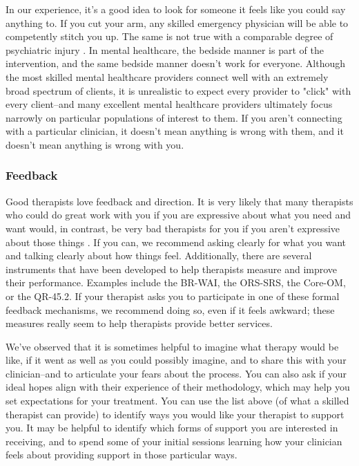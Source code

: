 \documentclass[12pt,letterpaper]{book}
\begin{document}
In our experience, it's a good idea to look for someone it feels like you could say anything to. If you cut your arm, any skilled emergency physician will be able to competently stitch you up. The same is not true with a comparable degree of psychiatric injury \cite{firth2019therapistEffects}. In mental healthcare, the bedside manner is part of the intervention, and the same bedside manner doesn't work for everyone. Although the most skilled mental healthcare providers connect well with an extremely broad spectrum of clients, it is unrealistic to expect every provider to "click" with every client–and many excellent mental healthcare providers ultimately focus narrowly on particular populations of interest to them. If you aren't connecting with a particular clinician, it doesn't mean anything is wrong with them, and it doesn't mean anything is wrong with you.

\subsubsection*{Feedback}
Good therapists love feedback and direction. It is very likely that many therapists who could do great work with you if you are expressive about what you need and want would, in contrast, be very bad therapists for you if you aren't expressive about those things \cite{macdonald2015correcting,delgadillo2022progress,lambert2001effects,oanes2015therapists}. If you can, we recommend asking clearly for what you want and talking clearly about how things feel. Additionally, there are several instruments that have been developed to help therapists measure and improve their performance. Examples include the BR-WAI, the ORS-SRS, the Core-OM, or the QR-45.2. If your therapist asks you to participate in one of these formal feedback mechanisms, we recommend doing so, even if it feels awkward; these measures really seem to help therapists provide better services.

We've observed that it is sometimes helpful to imagine what therapy would be like, if it went as well as you could possibly imagine, and to share this with your clinician–and to articulate your fears about the process. You can also ask if your ideal hopes align with their experience of their methodology, which may help you set expectations for your treatment. You can use the list above (of what a skilled therapist can provide) to identify ways you would like your therapist to support you. It may be helpful to identify which forms of support you are interested in receiving, and to spend some of your initial sessions learning how your clinician feels about providing support in those particular ways.
\end{document}
